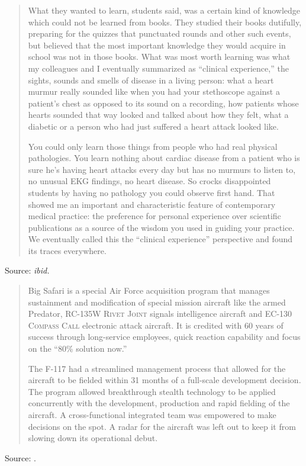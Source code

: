 \documentclass[a4paper]{article}
\begin{document}
\begin{quotation}
	What they wanted to learn, students said, was a certain kind
	of knowledge which could not be learned from books. They
	studied their books dutifully, preparing for the quizzes that
	punctuated rounds and other such events, but believed that the
	most important knowledge they would acquire in school was not in
	those books. What was most worth learning was what my colleagues
	and I eventually summarized as ``clinical experience,'' the sights,
	sounds and smells of disease in a living person: what a heart
	murmur really sounded like when you had your stethoscope against
	a patient's chest as opposed to its sound on a recording, how
	patients whose hearts sounded that way looked and talked about
	how they felt, what a diabetic or a person who had just suffered
	a heart attack looked like.

	You could only learn those things from people who had real
	physical pathologies.  You learn nothing about cardiac disease
	from a patient who is sure he's having heart attacks every
	day but has no murmurs to listen to, no unusual EKG findings,
	no heart disease. So crocks disappointed students by having
	no pathology you could observe first hand. That showed me an
	important and characteristic feature of contemporary medical
	practice: the preference for personal experience over scientific
	publications as a source of the wisdom you used in guiding your
	practice. We eventually called this the ``clinical experience''
	perspective and found its traces everywhere.
\end{quotation}
Source: {\it ibid.}
\medskip

\begin{quotation}
	Big Safari is a special Air Force acquisition program that
	manages sustainment and modification of special mission aircraft
	like the armed Predator, RC-135W \textsc{Rivet Joint} signals intelligence
	aircraft and EC-130 \textsc{Compass Call} electronic attack aircraft. It is
	credited with 60 years of success through long-service employees,
	quick reaction capability and focus on the ``80\% solution now.''

	The F-117 had a streamlined management process that allowed
	for the aircraft to be fielded within 31 months of a full-scale
	development decision. The program allowed breakthrough stealth
	technology to be applied concurrently with the development,
	production and rapid fielding of the aircraft. A cross-functional
	integrated team was empowered to make decisions on the spot. A
	radar for the aircraft was left out to keep it from slowing down
	its operational debut.
\end{quotation}
Source: \citet{Fulghum2011a}.
\medskip
\end{document}
